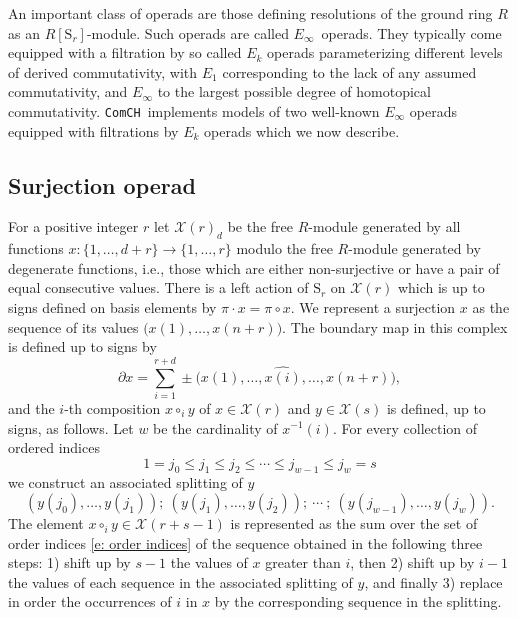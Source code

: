 \documentclass{amsart}
\renewcommand{\S}{\mathrm{S}}
\newcommand{\comch}{\texttt{ComCH}}
\newcommand{\X}{\mathcal X}
\begin{document}
An important class of operads are those defining resolutions of the ground ring $R$ as an $R[\S_r]$-module.
Such operads are called \mbox{$E_\infty$ operads}.
They typically come equipped with a filtration by so called $E_k$ operads parameterizing different levels of derived commutativity, with $E_1$ corresponding to the lack of any assumed commutativity, and $E_\infty$ to the largest possible degree of homotopical commutativity.
\comch\, implements models of two well-known $E_\infty$ operads equipped with filtrations by $E_k$ operads which we now describe.

\subsection{Surjection operad}

For a positive integer $r$ let $\mathcal X(r)_d$ be the free $R$-module generated by all functions $x : \{1, \dots, d+r\} \to \{1, \dots, r\}$ modulo the free $R$-module generated by degenerate functions, i.e., those which are either non-surjective or have a pair of equal consecutive values.
There is a left action of $\S_r$ on $\mathcal X(r)$ which is up to signs defined on basis elements by $\pi \cdot x = \pi \circ x$.
We represent a surjection $x$ as the sequence of its values $\big( x(1), \dots, x(n+r) \big)$.
The boundary map in this complex is defined up to signs by
\begin{equation*}
\partial x = \sum_{i = 1}^{r+d} \pm \big( x(1), \dots, \widehat{x(i)}, \dots, x(n+r) \big),
\end{equation*}
and the $i$-th composition $x \circ_i y$ of $x \in \mathcal X(r)$ and $y \in \mathcal X(s)$ is defined, up to signs, as follows.
Let $w$ be the cardinality of $x^{-1}(i)$.
For every collection of ordered indices
\begin{equation} \label{e: order indices}
1 = j_0 \leq j_1 \leq j_2 \leq \cdots \leq j_{w-1} \leq j_w = s
\end{equation}
we construct an associated splitting of $y$
\begin{equation*}
(y(j_0), \dots, y(j_1));\ (y(j_1), \dots, y(j_2));\ \cdots \ ;\ (y(j_{w-1}), \dots, y(j_w)).
\end{equation*}
The element $x \circ_i y \in \X(r+s-1)$ is represented as the sum over the set of order indices \eqref{e: order indices} of the sequence obtained in the following three steps: 1) shift up by $s-1$ the values of $x$ greater than $i$, then 2) shift up by $i-1$ the values of each sequence in the associated splitting of $y$, and finally 3) replace in order the occurrences of $i$ in $x$ by the corresponding sequence in the splitting.
\end{document}
